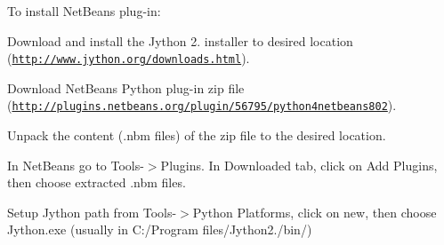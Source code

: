 To install Net\+Beans\textquotesingle{} plug-\/in\+:
\begin{DoxyEnumerate}
\item Download and install the Jython 2. installer to desired location (\href{http://www.jython.org/downloads.html}{\tt http\+://www.\+jython.\+org/downloads.\+html}).
\item Download Net\+Beans Python plug-\/in zip file (\href{http://plugins.netbeans.org/plugin/56795/python4netbeans802}{\tt http\+://plugins.\+netbeans.\+org/plugin/56795/python4netbeans802}).
\item Unpack the content (.nbm files) of the zip file to the desired location.
\item In Net\+Beans go to Tools-\/$>$Plugins. In Downloaded tab, click on Add Plugins, then choose extracted .nbm files.
\item Setup Jython path from Tools-\/$>$Python Platforms, click on new, then choose Jython.\+exe (usually in C\+:/\+Program files/\+Jython2./bin/)
\end{DoxyEnumerate}

